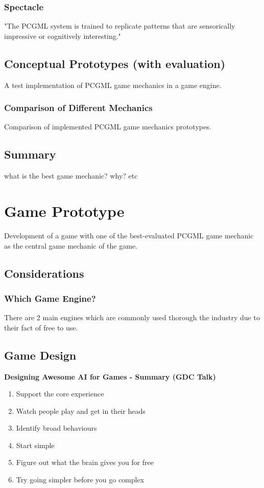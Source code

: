 \documentclass[MGS,Master,english]{twbook}%
\begin{document}
\subsection{Spectacle}
"The \ac{PCGML} system is trained to replicate patterns that are sensorically impressive or cognitively interesting." \cite{pcgml::paper}

\section{Conceptual Prototypes (with evaluation)}
A test implementation of PCGML game mechanics in a game engine.

\subsection{Comparison of Different Mechanics}
Comparison of implemented PCGML game mechanics prototypes.

\section{Summary}
what is the best game mechanic? why? etc
%
%
\clearpage
\chapter{Game Prototype}
Development of a game with one of the best-evaluated PCGML game mechanic as the central game mechanic of the game.
\section{Considerations}

\subsection{Which Game Engine?}
There are 2 main engines which are commonly used thorough the industry due to their fact of free to use.

\section{Game Design}
\textbf{Designing Awesome AI for Games - Summary (GDC Talk)}
\begin{enumerate}
	\item Support the core experience
	\item Watch people play and get in their heads
	\item Identify broad behaviours
	\item Start simple
	\item Figure out what the brain gives you for free
	\item Try going simpler before you go complex
\end{enumerate}
\end{document}
